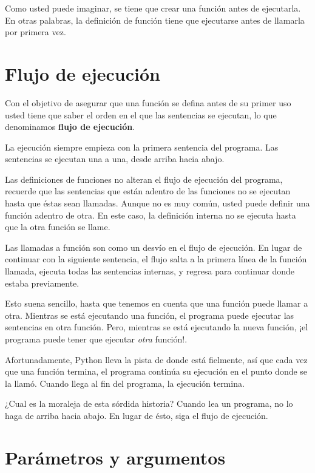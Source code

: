 Como usted puede imaginar, se tiene que crear una función antes de
ejecutarla. En otras palabras, la definición de función tiene que
ejecutarse antes de llamarla por primera vez.

\section{Flujo de ejecución}


Con el objetivo de asegurar que una función se defina antes de su
primer uso usted tiene que saber el orden en el que las sentencias
se ejecutan, lo que denominamos \textbf{flujo de ejecución}.

La ejecución siempre empieza con la primera sentencia del programa.
Las sentencias se ejecutan una a una, desde arriba hacia abajo.

Las definiciones de funciones no alteran el flujo de ejecución del
programa, recuerde que las sentencias que están adentro de las funciones
no se ejecutan hasta que éstas sean llamadas. Aunque no es muy común,
usted puede definir una función adentro de otra. En este caso, la
definición interna no se ejecuta hasta que la otra función se llame.

Las llamadas a función son como un desvío en el flujo de ejecución.
En lugar de continuar con la siguiente sentencia, el flujo salta a
la primera línea de la función llamada, ejecuta todas las sentencias
internas, y regresa para continuar donde estaba previamente.

Esto suena sencillo, hasta que tenemos en cuenta que una función puede
llamar a otra. Mientras se está ejecutando una función, el programa
puede ejecutar las sentencias en otra función. Pero, mientras se está
ejecutando la nueva función, ¡el programa puede tener que ejecutar
\textit{otra} función!.

Afortunadamente, Python lleva la pista de donde está fielmente, así
que cada vez que una función termina, el programa continúa su ejecución
en el punto donde se la llamó. Cuando llega al fin del programa, la
ejecución termina.

¿Cual es la moraleja de esta sórdida historia? Cuando lea un programa,
no lo haga de arriba hacia abajo. En lugar de ésto, siga el flujo
de ejecución.

\section{Parámetros y argumentos}

